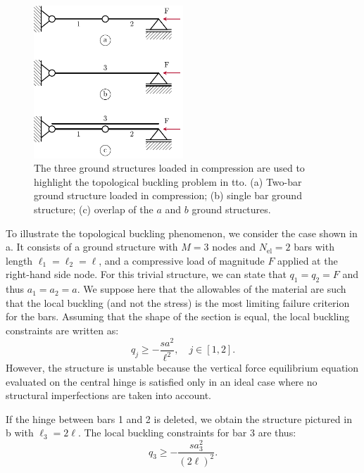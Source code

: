 \begin{figure}
    \centering
    \includegraphics[width=0.5\textwidth]{figures/04_TTO_improvements/01_3_bars_chain/3_bars_chain.pdf}
    \caption{The three ground structures loaded in compression are used to highlight the topological buckling problem in \gls{tto}. (a) Two-bar ground structure loaded in compression; (b) single bar ground structure; (c) overlap of the $a$ and $b$ ground structures.}
    \label{fig:chain_buck}
\end{figure}

To illustrate the topological buckling phenomenon, we consider the case shown in a. It consists of a ground structure with $M=3$ nodes and $N_{\text{el}}=2$ bars with length $\ell_1=\ell_2=\ell$, and a compressive load of magnitude $F$ applied at the right-hand side node. For this trivial structure, we can state that $q_1=q_2=F$ and thus $a_1=a_2=a$. We suppose here that the allowables of the material are such that the local buckling (and not the stress) is the most limiting failure criterion for the bars. Assuming that the shape of the section is equal, the local buckling constraints are written as:
\begin{equation}
    q_j\geq -\frac{s a^2}{\ell^2}, \quad j\in[1,2].
    \label{eq:chain_1}
\end{equation}
However, the structure is unstable because the vertical force equilibrium equation evaluated on the central hinge is satisfied only in an ideal case where no structural imperfections are taken into account.

If the hinge between bars 1 and 2 is deleted, we obtain the structure pictured in b with $\ell_3=2\ell$. The local buckling constraints for bar 3 are thus:
\begin{equation}
    q_3\geq -\frac{s a_3^2}{(2\ell)^2}.
    \label{eq:chain_2}
\end{equation}

